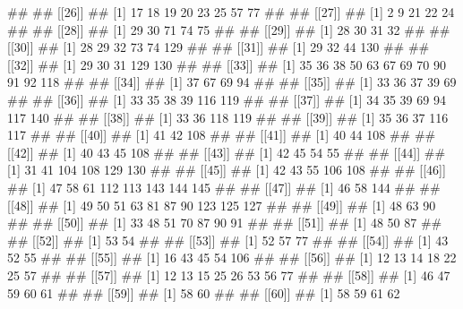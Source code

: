\documentclass[11pt,]{article}
\newenvironment{Shaded}{\begin{snugshade}}{\end{snugshade}}
\newcommand{\NormalTok}[1]{#1}
\begin{document}
\begin{Shaded}
\begin{Highlighting}[]
\NormalTok{## }
\NormalTok{## [[26]]}
\NormalTok{## [1] 17 18 19 20 23 25 57 77}
\NormalTok{## }
\NormalTok{## [[27]]}
\NormalTok{## [1]  2  9 21 22 24}
\NormalTok{## }
\NormalTok{## [[28]]}
\NormalTok{## [1] 29 30 71 74 75}
\NormalTok{## }
\NormalTok{## [[29]]}
\NormalTok{## [1] 28 30 31 32}
\NormalTok{## }
\NormalTok{## [[30]]}
\NormalTok{## [1]  28  29  32  73  74 129}
\NormalTok{## }
\NormalTok{## [[31]]}
\NormalTok{## [1]  29  32  44 130}
\NormalTok{## }
\NormalTok{## [[32]]}
\NormalTok{## [1]  29  30  31 129 130}
\NormalTok{## }
\NormalTok{## [[33]]}
\NormalTok{##  [1]  35  36  38  50  63  67  69  70  90  91  92 118}
\NormalTok{## }
\NormalTok{## [[34]]}
\NormalTok{## [1] 37 67 69 94}
\NormalTok{## }
\NormalTok{## [[35]]}
\NormalTok{## [1] 33 36 37 39 69}
\NormalTok{## }
\NormalTok{## [[36]]}
\NormalTok{## [1]  33  35  38  39 116 119}
\NormalTok{## }
\NormalTok{## [[37]]}
\NormalTok{## [1]  34  35  39  69  94 117 140}
\NormalTok{## }
\NormalTok{## [[38]]}
\NormalTok{## [1]  33  36 118 119}
\NormalTok{## }
\NormalTok{## [[39]]}
\NormalTok{## [1]  35  36  37 116 117}
\NormalTok{## }
\NormalTok{## [[40]]}
\NormalTok{## [1]  41  42 108}
\NormalTok{## }
\NormalTok{## [[41]]}
\NormalTok{## [1]  40  44 108}
\NormalTok{## }
\NormalTok{## [[42]]}
\NormalTok{## [1]  40  43  45 108}
\NormalTok{## }
\NormalTok{## [[43]]}
\NormalTok{## [1] 42 45 54 55}
\NormalTok{## }
\NormalTok{## [[44]]}
\NormalTok{## [1]  31  41 104 108 129 130}
\NormalTok{## }
\NormalTok{## [[45]]}
\NormalTok{## [1]  42  43  55 106 108}
\NormalTok{## }
\NormalTok{## [[46]]}
\NormalTok{## [1]  47  58  61 112 113 143 144 145}
\NormalTok{## }
\NormalTok{## [[47]]}
\NormalTok{## [1]  46  58 144}
\NormalTok{## }
\NormalTok{## [[48]]}
\NormalTok{##  [1]  49  50  51  63  81  87  90 123 125 127}
\NormalTok{## }
\NormalTok{## [[49]]}
\NormalTok{## [1] 48 63 90}
\NormalTok{## }
\NormalTok{## [[50]]}
\NormalTok{## [1] 33 48 51 70 87 90 91}
\NormalTok{## }
\NormalTok{## [[51]]}
\NormalTok{## [1] 48 50 87}
\NormalTok{## }
\NormalTok{## [[52]]}
\NormalTok{## [1] 53 54}
\NormalTok{## }
\NormalTok{## [[53]]}
\NormalTok{## [1] 52 57 77}
\NormalTok{## }
\NormalTok{## [[54]]}
\NormalTok{## [1] 43 52 55}
\NormalTok{## }
\NormalTok{## [[55]]}
\NormalTok{## [1]  16  43  45  54 106}
\NormalTok{## }
\NormalTok{## [[56]]}
\NormalTok{## [1] 12 13 14 18 22 25 57}
\NormalTok{## }
\NormalTok{## [[57]]}
\NormalTok{## [1] 12 13 15 25 26 53 56 77}
\NormalTok{## }
\NormalTok{## [[58]]}
\NormalTok{## [1] 46 47 59 60 61}
\NormalTok{## }
\NormalTok{## [[59]]}
\NormalTok{## [1] 58 60}
\NormalTok{## }
\NormalTok{## [[60]]}
\NormalTok{## [1] 58 59 61 62}

\end{Highlighting}
\end{Shaded}
\end{document}
